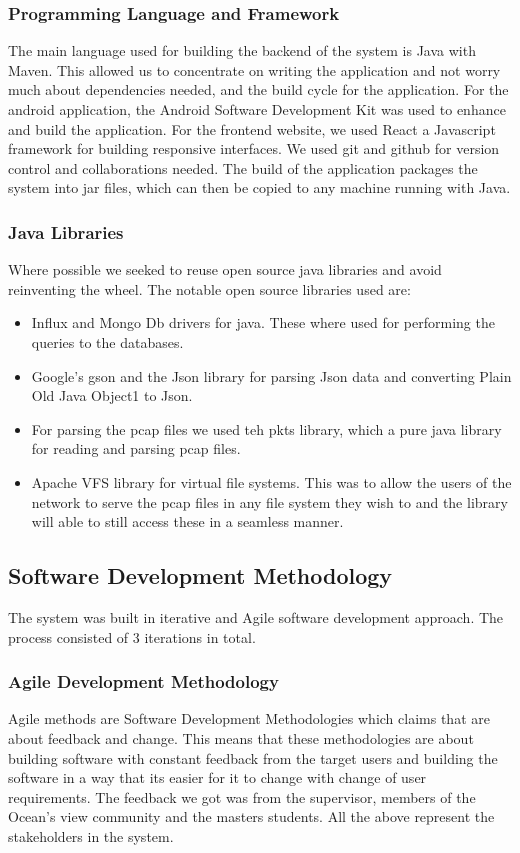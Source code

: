 \subsubsection{Programming Language and Framework}
The main language used for building the backend of the system is Java with Maven.
This allowed us to concentrate on writing the application and not worry much about dependencies needed, and the build cycle for the application.
For the android application, the Android Software Development Kit was used to enhance and build the application.
For the frontend website, we used React a Javascript framework for building responsive interfaces.
We used git and github for version control and collaborations needed.
The build of the application packages the system into jar files, which can then be copied to any machine running with Java.
\subsubsection{Java Libraries}
Where possible we seeked to reuse open source java libraries and avoid reinventing the wheel.
The notable open source libraries used are:
\begin{itemize}
    \item Influx and Mongo Db drivers for java.
    These where used for performing the queries to the databases.
    \item Google's gson and the Json library for parsing Json data and converting Plain Old Java Object1 to Json.
    \item For parsing the pcap files we used teh pkts library, which a pure java library for reading and parsing pcap files.
    \item Apache VFS library for virtual file systems.
    This was to allow the users of the network to serve the pcap files in any file system they wish to and the  library will able to still access these in a seamless manner.
\end{itemize}
\subsection{Software Development Methodology}\label{subsec:software-development-methodology}
The system was built in iterative and Agile software development approach.
The process consisted of 3 iterations in total.
\subsubsection{Agile Development Methodology}
Agile methods are Software Development Methodologies which\cite{1204373} claims that are about feedback and change.
This means that these methodologies are about building software with constant feedback from the target users and building the software in a way that its easier for it to change with change of user requirements.
The feedback we got was from the supervisor, members of the Ocean's view community and the masters students.
All the above represent the stakeholders in the system.
